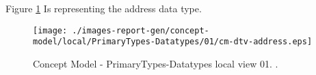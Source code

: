 Figure \ref{fig:lu.uni.lassy.excalibur.group09.spec-CM-view-local-PrimaryTypes-Datatypes-01} Is representing the address data type.



\begin{figure}[htbp] 
\label{fig:lu.uni.lassy.excalibur.group09.spec-CM}
\begin{center}
\texttt{[image: ./images-report-gen/concept-model/local/PrimaryTypes-Datatypes/01/cm-dtv-address.eps]}
\end{center}
\caption[Concept Model - PrimaryTypes-Datatypes local view 01 - ]{Concept Model - PrimaryTypes-Datatypes local view 01. .}
\label{fig:lu.uni.lassy.excalibur.group09.spec-CM-view-local-PrimaryTypes-Datatypes-01}
\end{figure}
\vspace{0.5cm} 

